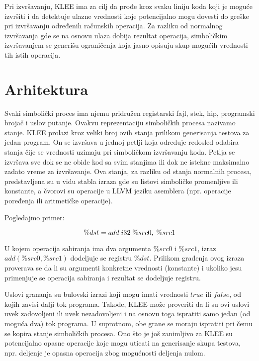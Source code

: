 \documentclass[a4paper]{article}
\begin{document}
{	Pri izvršavanju, KLEE ima za cilj da prođe kroz svaku liniju koda koji je moguće izvršiti i da detektuje ulazne vrednosti koje potencijalno mogu dovesti do greške pri izvršavanju određenih računskih operacija. Za razliku od normalnog izvršavanja gde se na osnovu ulaza dobija rezultat operacija, simboličkim izvršavanjem se generišu ograničenja koja jasno opisuju skup mogućih vrednosti tih istih operacija.

\section{Arhitektura}
\label{sec:arhitektura}

	Svaki simbolički proces ima njemu pridružen registarski fajl, stek, hip, programski brojač i uslov putanje. Ovakvu reprezentaciju simboličkih procesa nazivamo stanje. KLEE prolazi kroz veliki broj ovih stanja prilikom generisanja testova za jedan program. On se izvršava u jednoj petlji koja određuje redosled odabira stanja čije se vrednosti uzimaju pri simboličkom izvršavanju koda. Petlja se izvršava sve dok se ne obiđe kod sa svim stanjima ili dok ne istekne maksimalno zadato vreme za izvršavanje. Ova stanja, za razliku od stanja normalnih procesa, predstavljena su u vidu stabla izraza gde su listovi simboličke promenljive ili konstante, a čvorovi su operacije u LLVM jeziku asemblera (npr. operacije poređenja ili aritmetičke operacije).
	
	Pogledajmo primer:
	
	\begin{equation}
		 \%dst = add \hspace{1mm} i32 \hspace{1mm} \%src0, \hspace{1mm} \%src1
	\end{equation}
	
	U kojem operacija sabiranja ima dva argumenta $ \%src0 $ i $ \%src1 $, izraz $ add(\%src0, \%src1) $ dodeljuje se registru $ \%dst $. Prilikom građenja ovog izraza proverava se da li su argumenti konkretne vrednosti (konstante) i ukoliko jesu primenjuje se operacija sabiranja i rezultat se dodeljuje registru. 
	
	Uslovi grananja su bulovski izrazi koji mogu imati vrednosti $ true $ ili $ false $, od kojih zavisi dalji tok programa. Takođe, KLEE može proveriti da li su ovi uslovi uvek zadovoljeni ili uvek nezadovoljeni i na osnovu toga ispratiti samo jedan (od moguća dva) tok programa. U suprotnom, obe grane se moraju ispratiti pri čemu se kopira stanje simboličkih procesa. Ono što je još zanimljivo za KLEE su potencijalno opasne operacije koje mogu uticati na generisanje skupa testova, npr. deljenje je opasna operacija zbog mogućnosti deljenja nulom.

}
\end{document}

